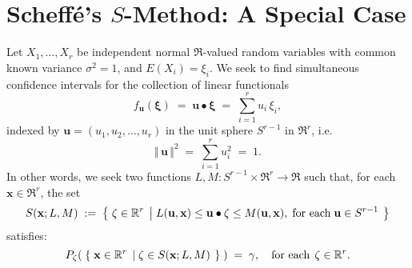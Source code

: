 \section{Scheff\'{e}'s $S$-Method: A Special Case}

Let $X_{1}, \ldots, X_{r}$ be independent normal $\Re$-valued random variables with common known
variance $\sigma^{2} = 1$, and $E(X_{i}) = \xi_{i}$.  We seek to find simultaneous confidence
intervals for the collection of linear functionals
\begin{equation*}
f_{\mathbf{u}}(\mathbf{\xi}) \; = \; \mathbf{u} \bullet \mathbf{\xi} \; = \; \sum^{r}_{i=1} u_{i}\,\xi_{i},
\end{equation*}
indexed by $\mathbf{u} = (u_{1},u_{2},\ldots,u_{r})$ in the unit sphere $S^{r-1}$ in $\Re^{r}$, i.e. 
\begin{equation*}
\Vert\,\mathbf{u}\,\Vert^{2} \; = \; \sum^{r}_{i=1} u_{i}^{2} \; = \; 1.
\end{equation*}
In other words, we seek two functions $L,M : S^{r-1} \times \Re^{r} \longrightarrow \Re$ such that,
for each $\mathbf{x} \in \Re^{r}$, the set
\begin{equation*}
S(\mathbf{x};L,M) \; := \;
\left\{\;
\zeta \in \Re^{r}
\;\left\vert\;
L(\mathbf{u},\mathbf{x}) \leq \mathbf{u} \bullet \mathbf{\zeta} \leq M(\mathbf{u},\mathbf{x}),
\;\textnormal{for each}\; \mathbf{u} \in S^{r-1}
\right.
\;\right\}
\end{equation*}
satisfies:
\begin{equation*}
P_{\zeta}\!\left(\;
\left\{\;
\mathbf{x}\in\Re^{r}
\;\left\vert\;
\zeta \in S(\mathbf{x};L,M)
\right.
\;\right\}
\;\right)
\; = \; \gamma,
\quad
\textnormal{for each}\,\; \zeta \in \Re^{r}.
\end{equation*}

